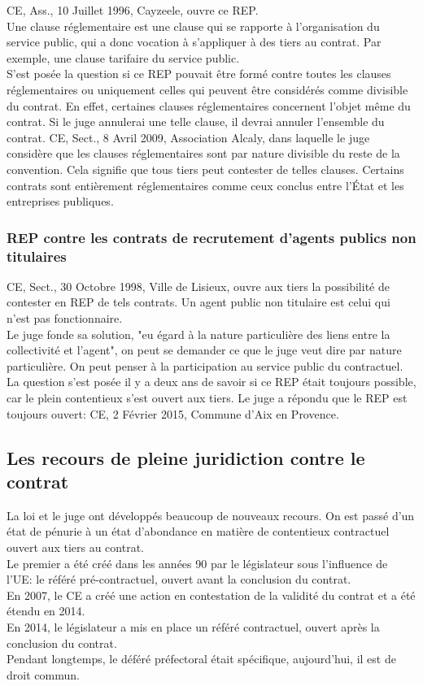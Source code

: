 \documentclass[10pt, a4paper, openany]{book}
\begin{document}
CE, Ass., 10 Juillet 1996, Cayzeele, ouvre ce REP. \\
Une clause réglementaire est une clause qui se rapporte à l'organisation du service public, qui a donc vocation à s'appliquer à des tiers au contrat. Par exemple, une clause tarifaire du service public. \\
S'est posée la question si ce REP pouvait être formé contre toutes les clauses réglementaires ou uniquement celles qui peuvent être considérés comme divisible du contrat. En effet, certaines clauses réglementaires concernent l'objet même du contrat. Si le juge annulerai une telle clause, il devrai annuler l'ensemble du contrat. CE, Sect., 8 Avril 2009, Association Alcaly, dans laquelle le juge considère que les clauses réglementaires sont par nature divisible du reste de la convention. Cela signifie que tous tiers peut contester de telles clauses. Certains contrats sont entièrement réglementaires comme ceux conclus entre l'État et les entreprises publiques.  

\subsubsection{REP contre les contrats de recrutement d'agents publics non titulaires}

CE, Sect., 30 Octobre 1998, Ville de Lisieux, ouvre aux tiers la possibilité de contester en REP de tels contrats. Un agent public non titulaire est celui qui n'est pas fonctionnaire. \\
Le juge fonde sa solution, "eu égard à la nature particulière des liens entre la collectivité et l'agent", on peut se demander ce que le juge veut dire par nature particulière. On peut penser à  la participation au service public du contractuel. \\
La question s'est posée il y a deux ans de savoir si ce REP était toujours possible, car le plein contentieux s'est ouvert aux tiers. Le juge a répondu que le REP est toujours ouvert: CE, 2 Février 2015, Commune d'Aix en Provence.


\subsection{Les recours de pleine juridiction contre le contrat}

La loi et le juge ont développés beaucoup de nouveaux recours. On est passé d'un état de pénurie à un état d'abondance en matière de contentieux contractuel ouvert aux tiers au contrat. \\
Le premier a été créé dans les années 90 par le législateur sous l'influence de l'UE: le référé pré-contractuel, ouvert avant la conclusion du contrat. \\
En 2007, le CE a créé une action en contestation de la validité du contrat et a été étendu en 2014. \\
En 2014, le législateur a mis en place un référé contractuel, ouvert après la conclusion du contrat. \\
Pendant longtemps, le déféré préfectoral était spécifique, aujourd'hui, il est de droit commun.
\end{document}
